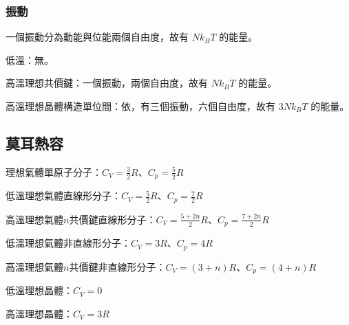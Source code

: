 \documentclass[a4paper,12pt]{report}
\begin{document}
\subsubsection{振動}
一個振動分為動能與位能兩個自由度，故有 \( Nk_B T \) 的能量。
\bit
\item 低溫：無。
\item 高溫理想共價鍵：一個振動，兩個自由度，故有 \( Nk_B T \) 的能量。
\item 高溫理想晶體構造單位間：依，有三個振動，六個自由度，故有 \( 3 Nk_B T \) 的能量。
\eit
\subsection{莫耳熱容}
\bit
\item 理想氣體單原子分子：$C_V=\frac{3}{2} R$、$C_p=\frac{5}{2}R$
\item 低溫理想氣體直線形分子：$C_V=\frac{5}{2}R$、$C_p=\frac{7}{2}R$
\item 高溫理想氣體$n$共價鍵直線形分子：$C_V=\frac{5+2n}{2}R$、$C_p=\frac{7+2n}{2}R$
\item 低溫理想氣體非直線形分子：$C_V=3R$、$C_p=4R$
\item 高溫理想氣體$n$共價鍵非直線形分子：$C_V=(3+n)R$、$C_p=(4+n)R$
\item 低溫理想晶體：$C_V=0$
\item 高溫理想晶體：$C_V=3R$
\eit
\end{document}
